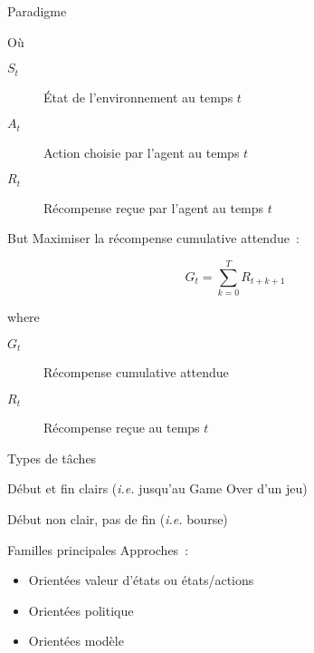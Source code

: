 \begin{frame}{Paradigme}

  Où

  \begin{description}
    \item[$S_t$] État de l'environnement au temps $t$
    \item[$A_t$] Action choisie par l'agent au temps $t$
    \item[$R_t$] Récompense reçue par l'agent au temps $t$
  \end{description}
\end{frame}

\begin{frame}{But}
  Maximiser la récompense cumulative attendue~:

  \[
    G_t = \sum_{k=0}^T R_{t+k+1}
  \]

  where

  \begin{description}
    \item[$G_t$] Récompense cumulative attendue
    \item[$R_t$] Récompense reçue au temps $t$
  \end{description}
\end{frame}

\begin{frame}{Types de tâches}
  \begin{description}[<+->]
    \item[Épisodique] Début et fin clairs (\textit{i.e.} jusqu'au Game Over d'un jeu)
    \item[Continue] Début non clair, pas de fin (\textit{i.e.} bourse)
  \end{description}
\end{frame}

\begin{frame}{Familles principales}
  Approches~:

  \begin{itemize}
    \item Orientées valeur d'états ou états/actions
    \item Orientées politique
    \item Orientées modèle
  \end{itemize}
\end{frame}

